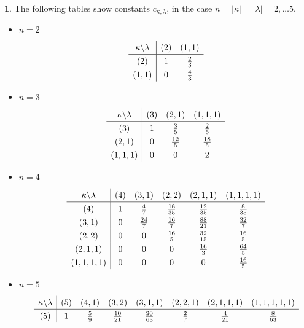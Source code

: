 \documentclass[10pt,oneside,american]{amsart}
\numberwithin{equation}{section}
\numberwithin{figure}{section}
\theoremstyle{definition}
\theoremstyle{remark}
\theoremstyle{plain}
\theoremstyle{definition}
\newtheorem{example}{\protect\examplename}[section]
\theoremstyle{plain}
\providecommand{\examplename}{Example}
\begin{document}
\begin{example}
\label{Tables}The following tables \cite[pp.~238]{Muirhead} show
constants $c_{\kappa,\lambda}$, in the case $n=\left|\kappa\right|=\left|\lambda\right|=2,\ldots5$. 
\begin{itemize}
\item $n=2$
\[
\def\arraystretch{1.3}
\begin{array}{c|cc}
\kappa\backslash\lambda & \left(2\right) & \left(1,1\right)\\ \hline
\left(2\right) & 1 & \frac{2}{3}\\
\left(1,1\right) & 0 & \frac{4}{3}
\end{array}
\]
\item $n=3$
\[
\def\arraystretch{1.3}
\begin{array}{c|ccc}
\kappa\backslash\lambda & \left(3\right) & \left(2,1\right) & \left(1,1,1\right)\\ \hline
\left(3\right) & 1 & \frac{3}{5} & \frac{2}{5}\\
\left(2,1\right) & 0 & \frac{12}{5} & \frac{18}{5}\\
\left(1,1,1\right) & 0 & 0 & 2
\end{array}
\]
\item $n=4$
\[
\def\arraystretch{1.3}
\begin{array}{c|ccccc}
\kappa\backslash\lambda & \left(4\right) & \left(3,1\right) & \left(2,2\right) & \left(2,1,1\right) & \left(1,1,1,1\right)\\ \hline
\left(4\right) & 1 & \frac{4}{7} & \frac{18}{35} & \frac{12}{35} & \frac{8}{35}\\
\left(3,1\right) & 0 & \frac{24}{7} & \frac{16}{7} & \frac{88}{21} & \frac{32}{7}\\
\left(2,2\right) & 0 & 0 & \frac{16}{5} & \frac{32}{15} & \frac{16}{5}\\
\left(2,1,1\right) & 0 & 0 & 0 & \frac{16}{3} & \frac{64}{5}\\
\left(1,1,1,1\right) & 0 & 0 & 0 & 0 & \frac{16}{5}
\end{array}
\]
\item $n=5$
\[
\def\arraystretch{1.3}
\begin{array}{c|ccccccc}
\kappa\backslash\lambda & \left(5\right) & \left(4,1\right) & \left(3,2\right) & \left(3,1,1\right) & \left(2,2,1\right) & \left(2,1,1,1\right) & \left(1,1,1,1,1\right)\\ \hline
\left(5\right) & 1 & \frac{5}{9} & \frac{10}{21} & \frac{20}{63} & \frac{2}{7} & \frac{4}{21} & \frac{8}{63}\\

\end{array}\]
\end{itemize}
\end{example}
\end{document}

